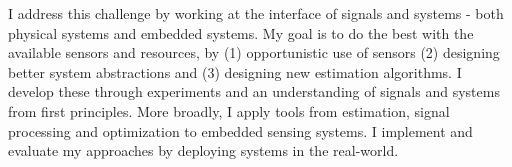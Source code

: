 \documentclass[10pt]{article}
\begin{document}
 


I address this challenge by working at the interface of signals and systems - both physical systems and embedded systems. 
My goal is to do the best with the available sensors and resources, by (1) opportunistic use of sensors (2) designing better system abstractions and (3) designing new estimation algorithms. I develop these through experiments and an understanding of signals and systems from first principles. %
More broadly, I apply tools from estimation, signal processing and optimization to embedded sensing systems. I implement and evaluate my approaches by deploying systems in the real-world. \\
\end{document}
